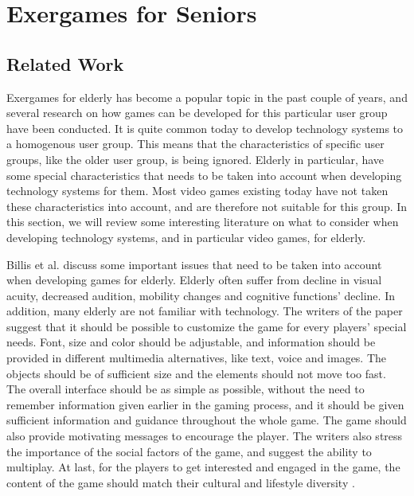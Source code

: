 \chapter{Exergames for Seniors}
\label{chap:exforseniors}

\section{Related Work}
Exergames for elderly has become a popular topic in the past couple of years, and several research on how games can be developed for this particular user group have been conducted. It is quite common today to develop technology systems to a homogenous user group. This means that the characteristics of specific user groups, like the older user group, is being ignored. Elderly in particular, have some special characteristics that needs to be taken into account when developing technology systems for them. Most video games existing today have not taken these characteristics into account, and are therefore not suitable for this group. In this section, we will review some interesting literature on what to consider when developing technology systems, and in particular video games, for elderly.  

Billis et al. \cite{Billis} discuss some important issues that need to be taken into account when developing games for elderly. Elderly often suffer from decline in visual acuity, decreased audition, mobility changes and cognitive functions' decline. In addition, many elderly are not familiar with technology. The writers of the paper suggest that it should be possible to customize the game for every players' special needs. Font, size and color should be adjustable, and information should be provided in different multimedia alternatives, like text, voice and images. The objects should be of sufficient size and the elements should not move too fast. The overall interface should be as simple as possible, without the need to remember information given earlier in the gaming process, and it should be given sufficient information and guidance throughout the whole game. The game should also provide motivating messages to encourage the player. The writers also stress the importance of the social factors of the game, and suggest the ability to multiplay. At last, for the players to get interested and engaged in the game, the content of the game should match their cultural and lifestyle diversity \cite{Billis}.

